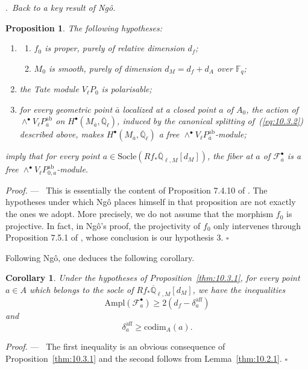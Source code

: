 \documentclass[12pt,a4paper,oneside,english,leqno]{smfart}
\makeatletter
\numberwithin{equation}{subsection}
\newcounter{theo}
\numberwithin{theo}{subsection}
\newenvironment{paragr}[1][]{\medskip\refstepcounter{subsection}%
  \par\noindent\hspace*{\parindent}\thesubsection.\ \emph{#1}%
  \@ifundefined{@empty}{}{}\ignorespaces}{\medskip}
\theoremstyle{plain}
\newtheorem{proposition}[theo]{Proposition}
\newtheorem{corollary}[theo]{Corollary}
\theoremstyle{definition}
\theoremstyle{remark}
\newenvironment{preuve}[1][]{\medskip\noindent\textit{Proof.} #1 ---\ }%
  {\hfill\ensuremath{\square}\medskip}
\newcommand{\QQ}{\mathbb{Q}}
\newcommand{\Fq}{\mathbb{F}_q}
\newcommand{\Qlb}{\overline{\mathbb{Q}}_{\ell}}
\newcommand{\fc}{\mathcal{F}}
\renewcommand{\geq}{\geqslant}
\makeatother
\begin{document}
\begin{paragr}[Back to a key result of Ngô.]
\begin{proposition}
The following hypotheses:
\begin{enumerate}
\item \begin{enumerate} \item[(a)] $f_0$ is proper, purely of relative dimension $d_f$; \item[(b)] $M_0$ is smooth, purely of dimension $d_M = d_f+d_A$ over $\Fq$;
  \end{enumerate}
\item the Tate module $V_\ell P_0$ is polarisable; \item for every geometric point $\bar{a}$ localized at a closed point $a$ of $A_0$, the action of $\wedge^\bullet V_\ell P_{\overline{a}}^{\mathrm{ab}}$ on $H^\bullet(M_{\overline{a}},\Qlb)$, induced by the canonical splitting of~(\ref{eq:10.3.2}) described above, makes $H^\bullet(M_{\overline{a}},\Qlb)$ a free $\wedge^\bullet V_\ell P_{\overline{a}}^{\mathrm{ab}}$-module;
\end{enumerate}
imply that for every point $a\in\mathrm{Socle}(Rf_*\overline{\QQ}_{\ell,M}[d_M])$, the fiber at $a$ of $\fc_a^\bullet$ is a free $\wedge^\bullet V_\ell P_{0,a}^{\mathrm{ab}}$-module.
\end{proposition}

\begin{preuve}
This is essentially the content of Proposition 7.4.10 of \cite{Ngo-lemme}. The hypotheses under which Ngô places himself in that proposition are not exactly the ones we adopt. More precisely, we do not assume that the morphism $f_0$ is projective. In fact, in Ngô's proof, the projectivity of $f_0$ only intervenes through Proposition 7.5.1 of \cite{Ngo-lemme}, whose conclusion is our hypothesis 3.
\end{preuve}

Following Ngô, one deduces the following corollary.

\begin{corollary}\label{thm:10.3.2}
Under the hypotheses of Proposition~\ref{thm:10.3.1}, for every point $a\in A$ which belongs to the socle of $Rf_*\overline{\QQ}_{\ell,M}[d_M]$, we have the inequalities
$$\mathrm{Ampl}(\fc_a^\bullet)\geq 2(d_f-\delta_a^{\mathrm{aff}})$$
and
$$\delta_a^{\mathrm{aff}}\geq\mathrm{codim}_A(a).$$
\end{corollary}

\begin{preuve}
The first inequality is an obvious consequence of Proposition~\ref{thm:10.3.1} and the second follows from Lemma~\ref{thm:10.2.1}.
\end{preuve}


\end{paragr}
\end{document}
